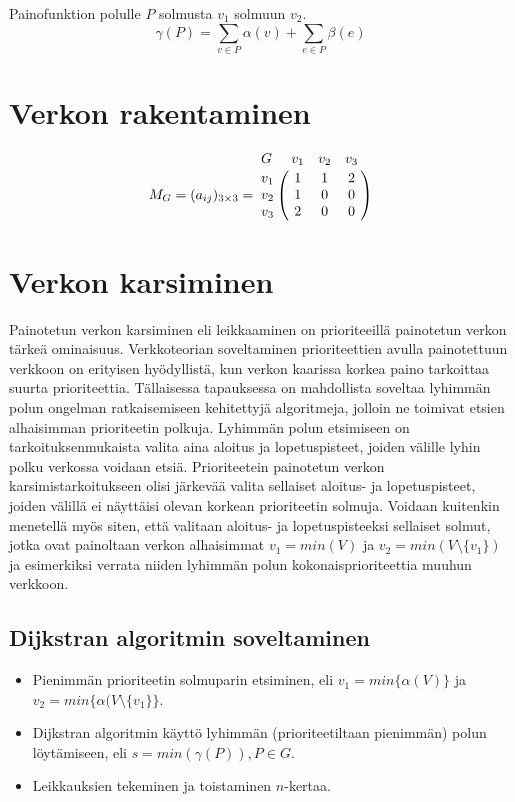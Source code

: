 Painofunktion polulle \(P\) solmusta \(v_1\) solmuun \(v_2\).
\[\gamma(P) = \sum_{v \in P} \alpha(v) + \sum_{e \in P} \beta(e)\]

\section{Verkon rakentaminen} \label{10_verkon_rakentaminen}

\[
  M_G = (a_{ij})_{3\times3} =
  \bordermatrix{
    G & v_1 & v_2 & v_3 \cr
    v_1 & 1 & 1 & 2 \cr
    v_2 & 1 & 0 & 0 \cr
    v_3 & 2 & 0 & 0 \cr
  }
\]

\section{Verkon karsiminen} \label{10_verkon_karsiminen}

Painotetun verkon karsiminen eli leikkaaminen on prioriteeillä painotetun verkon tärkeä ominaisuus.
Verkkoteorian soveltaminen prioriteettien avulla painotettuun verkkoon on erityisen hyödyllistä, kun verkon kaarissa korkea paino tarkoittaa suurta prioriteettia.
Tällaisessa tapauksessa on mahdollista soveltaa lyhimmän polun ongelman ratkaisemiseen kehitettyjä algoritmeja, jolloin ne toimivat etsien alhaisimman prioriteetin polkuja.
Lyhimmän polun etsimiseen on tarkoituksenmukaista valita aina aloitus ja lopetuspisteet, joiden välille lyhin polku verkossa voidaan etsiä.
Prioriteetein painotetun verkon karsimistarkoitukseen olisi järkevää valita sellaiset aloitus- ja lopetuspisteet, joiden välillä ei näyttäisi olevan korkean prioriteetin solmuja.
Voidaan kuitenkin menetellä myös siten, että valitaan aloitus- ja lopetuspisteeksi sellaiset solmut, jotka ovat painoltaan verkon alhaisimmat \(v_1 = min(V)\) ja \(v_2 = min(V \setminus \{v_1\})\) ja esimerkiksi verrata niiden lyhimmän polun kokonaisprioriteettia muuhun verkkoon.

  \subsection{Dijkstran algoritmin soveltaminen} \label{10_djikstran_algoritmin_soveltaminen}

  \begin{itemize}
    \item Pienimmän prioriteetin solmuparin etsiminen, eli \(v_1 = min\{ \alpha(V) \}\) ja \(v_2 = min\{\alpha( V \setminus \{v_1\} \}\).
    \item Dijkstran algoritmin käyttö lyhimmän (prioriteetiltaan pienimmän) polun löytämiseen, eli \(s = min( \gamma(P) ), P \in G\).
    \item Leikkauksien tekeminen ja toistaminen \(n\)-kertaa.
  \end{itemize}

